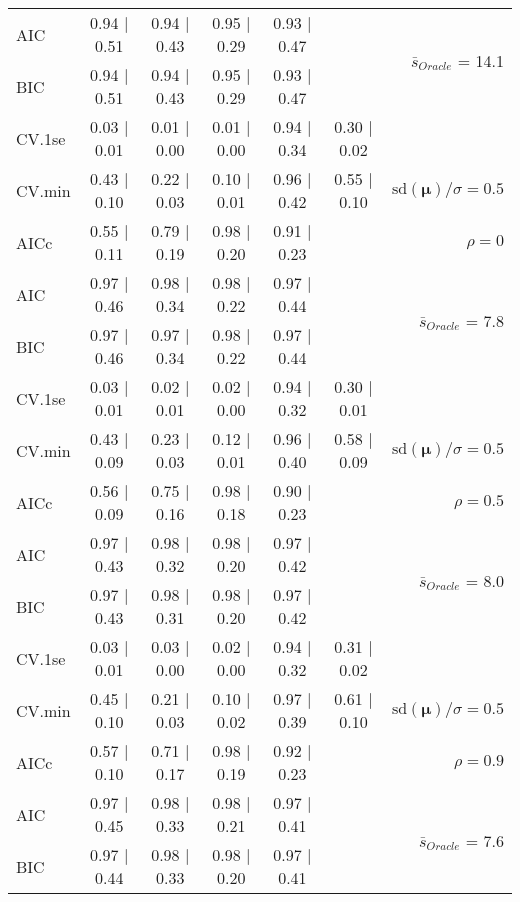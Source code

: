 \begin{table}
\begin{center}
\begin{tabular}{l*{5}{c}|r}
AIC & 0.94 $\mid$ 0.51 & 0.94 $\mid$ 0.43 & 0.95 $\mid$ 0.29 & 0.93 $\mid$ 0.47 & &  \multirow{2}{*}{$\bar{s}_{Oracle}$ = 14.1} \\
BIC & 0.94 $\mid$ 0.51 & 0.94 $\mid$ 0.43 & 0.95 $\mid$ 0.29 & 0.93 $\mid$ 0.47 & &  \\
 \hline 
CV.1se & 0.03 $\mid$ 0.01 & 0.01 $\mid$ 0.00 & 0.01 $\mid$ 0.00 & 0.94 $\mid$ 0.34 & 0.30 $\mid$ 0.02 & \\
CV.min & 0.43 $\mid$ 0.10 & 0.22 $\mid$ 0.03 & 0.10 $\mid$ 0.01 & 0.96 $\mid$ 0.42 & 0.55 $\mid$ 0.10 &  $\mathrm{sd}(\mathbf{\mu})/\sigma=0.5$ \\
AICc & 0.55 $\mid$ 0.11 & 0.79 $\mid$ 0.19 & 0.98 $\mid$ 0.20 & 0.91 $\mid$ 0.23 & & $\rho=0$ \\
AIC & 0.97 $\mid$ 0.46 & 0.98 $\mid$ 0.34 & 0.98 $\mid$ 0.22 & 0.97 $\mid$ 0.44 & &  \multirow{2}{*}{$\bar{s}_{Oracle}$ = 7.8} \\
BIC & 0.97 $\mid$ 0.46 & 0.97 $\mid$ 0.34 & 0.98 $\mid$ 0.22 & 0.97 $\mid$ 0.44 & &  \\
 \hline 
CV.1se & 0.03 $\mid$ 0.01 & 0.02 $\mid$ 0.01 & 0.02 $\mid$ 0.00 & 0.94 $\mid$ 0.32 & 0.30 $\mid$ 0.01 & \\
CV.min & 0.43 $\mid$ 0.09 & 0.23 $\mid$ 0.03 & 0.12 $\mid$ 0.01 & 0.96 $\mid$ 0.40 & 0.58 $\mid$ 0.09 &  $\mathrm{sd}(\mathbf{\mu})/\sigma=0.5$ \\
AICc & 0.56 $\mid$ 0.09 & 0.75 $\mid$ 0.16 & 0.98 $\mid$ 0.18 & 0.90 $\mid$ 0.23 & & $\rho=0.5$ \\
AIC & 0.97 $\mid$ 0.43 & 0.98 $\mid$ 0.32 & 0.98 $\mid$ 0.20 & 0.97 $\mid$ 0.42 & &  \multirow{2}{*}{$\bar{s}_{Oracle}$ = 8.0} \\
BIC & 0.97 $\mid$ 0.43 & 0.98 $\mid$ 0.31 & 0.98 $\mid$ 0.20 & 0.97 $\mid$ 0.42 & &  \\
 \hline 
CV.1se & 0.03 $\mid$ 0.01 & 0.03 $\mid$ 0.00 & 0.02 $\mid$ 0.00 & 0.94 $\mid$ 0.32 & 0.31 $\mid$ 0.02 & \\
CV.min & 0.45 $\mid$ 0.10 & 0.21 $\mid$ 0.03 & 0.10 $\mid$ 0.02 & 0.97 $\mid$ 0.39 & 0.61 $\mid$ 0.10 &  $\mathrm{sd}(\mathbf{\mu})/\sigma=0.5$ \\
AICc & 0.57 $\mid$ 0.10 & 0.71 $\mid$ 0.17 & 0.98 $\mid$ 0.19 & 0.92 $\mid$ 0.23 & & $\rho=0.9$ \\
AIC & 0.97 $\mid$ 0.45 & 0.98 $\mid$ 0.33 & 0.98 $\mid$ 0.21 & 0.97 $\mid$ 0.41 & &  \multirow{2}{*}{$\bar{s}_{Oracle}$ = 7.6} \\
BIC & 0.97 $\mid$ 0.44 & 0.98 $\mid$ 0.33 & 0.98 $\mid$ 0.20 & 0.97 $\mid$ 0.41 & &  \\
 \hline 
\end{tabular}
\end{center}
\vspace{-1cm}
\end{table}




